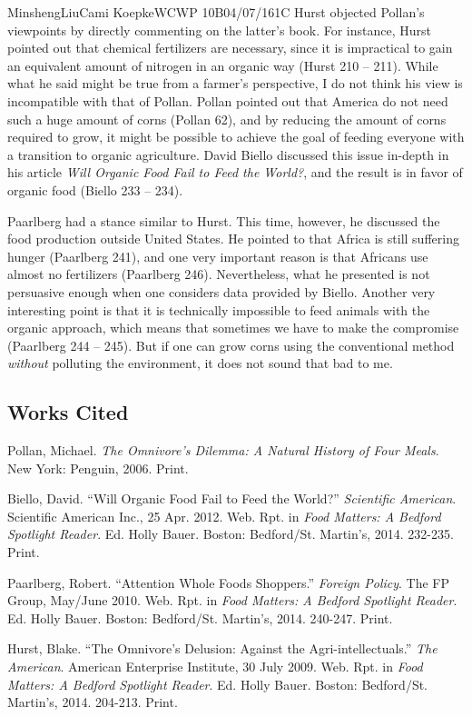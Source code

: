 \documentclass[12pt,letterpaper]{article}
\begin{document}
\begin{mla}{Minsheng}{Liu}{Cami Koepke}{WCWP 10B}{04/07/16}{1C}
Hurst objected Pollan's viewpoints by directly commenting on the
latter's book. For instance, Hurst pointed out that chemical fertilizers
are necessary, since it is impractical to gain an equivalent amount of
nitrogen in an organic way (Hurst 210 -- 211). While what he said might
be true from a farmer's perspective, I do not think his view is
incompatible with that of Pollan. Pollan pointed out that America do not
need such a huge amount of corns (Pollan 62), and by reducing the amount
of corns required to grow, it might be possible to achieve the goal of
feeding everyone with a transition to organic agriculture. David Biello
discussed this issue in-depth in his article \emph{Will Organic Food
Fail to Feed the World?}, and the result is in favor of organic food
(Biello 233 -- 234).

Paarlberg had a stance similar to Hurst. This time, however, he
discussed the food production outside United States. He pointed to that
Africa is still suffering hunger (Paarlberg 241), and one very important
reason is that Africans use almost no fertilizers (Paarlberg 246).
Nevertheless, what he presented is not persuasive enough when one
considers data provided by Biello. Another very interesting point is
that it is technically impossible to feed animals with the organic
approach, which means that sometimes we have to make the compromise
(Paarlberg 244 -- 245). But if one can grow corns using the conventional
method \emph{without} polluting the environment, it does not sound that
bad to me.


\subsection*{Works Cited}
\bibent Pollan, Michael. \textit{The Omnivore's Dilemma: A Natural History of Four Meals}. New York: Penguin, 2006. Print.

\bibent Biello, David. ``Will Organic Food Fail to Feed the World?'' \textit{Scientific American}. Scientific American Inc., 25 Apr. 2012. Web. Rpt. in \textit{Food Matters: A Bedford Spotlight Reader}. Ed. Holly Bauer. Boston: Bedford/St. Martin's, 2014. 232-235. Print.

\bibent Paarlberg, Robert. ``Attention Whole Foods Shoppers.'' \textit{Foreign Policy}. The FP Group, May/June 2010. Web. Rpt. in \textit{Food Matters: A Bedford Spotlight Reader}. Ed. Holly Bauer. Boston: Bedford/St. Martin’s, 2014. 240-247. Print.

\bibent Hurst, Blake. ``The Omnivore’s Delusion: Against the Agri-intellectuals.'' \textit{The American}. American Enterprise Institute, 30 July 2009. Web. Rpt. in \textit{Food Matters: A Bedford Spotlight Reader}. Ed. Holly Bauer. Boston: Bedford/St. Martin’s, 2014. 204-213. Print.


\end{mla}
\end{document}
